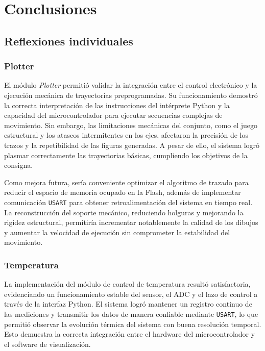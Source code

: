 \section{Conclusiones}

\subsection{Reflexiones individuales}

\subsubsection{Plotter}

El módulo \textit{Plotter} permitió validar la integración entre el control electrónico y la ejecución mecánica de trayectorias preprogramadas. Su funcionamiento demostró la correcta interpretación de las instrucciones del intérprete Python y la capacidad del microcontrolador para ejecutar secuencias complejas de movimiento. Sin embargo, las limitaciones mecánicas del conjunto, como el juego estructural y los atascos intermitentes en los ejes, afectaron la precisión de los trazos y la repetibilidad de las figuras generadas. A pesar de ello, el sistema logró plasmar correctamente las trayectorias básicas, cumpliendo los objetivos de la consigna.

Como mejora futura, sería conveniente optimizar el algoritmo de trazado para reducir el espacio de memoria ocupado en la Flash, además de implementar comunicación \texttt{USART} para obtener retroalimentación del sistema en tiempo real. La reconstrucción del soporte mecánico, reduciendo holguras y mejorando la rigidez estructural, permitiría incrementar notablemente la calidad de los dibujos y aumentar la velocidad de ejecución sin comprometer la estabilidad del movimiento.

\subsubsection{Temperatura}

La implementación del módulo de control de temperatura resultó satisfactoria, evidenciando un funcionamiento estable del sensor, el ADC y el lazo de control a través de la interfaz Python. El sistema logró mantener un registro continuo de las mediciones y transmitir los datos de manera confiable mediante \texttt{USART}, lo que permitió observar la evolución térmica del sistema con buena resolución temporal. Esto demuestra la correcta integración entre el hardware del microcontrolador y el software de visualización.

